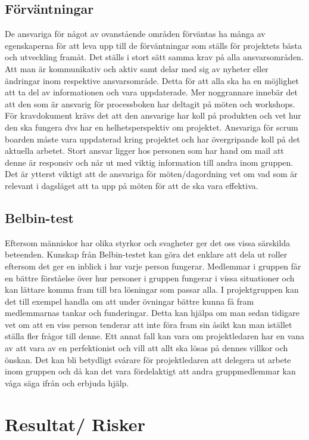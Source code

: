 \documentclass{article}
\begin{document}
\subsection{Förväntningar}

De ansvariga för något av ovanstående områden förväntas ha många av egenskaperna för att
leva upp till de förväntningar som ställs för projektets bästa och utveckling framåt. Det ställs i
stort sätt samma krav på alla ansvarsområden. Att man är kommunikativ och aktiv samt delar
med sig av nyheter eller ändringar inom respektive ansvarsområde. Detta för att alla ska ha en
möjlighet att ta del av informationen och vara uppdaterade. Mer noggrannare innebär det att
den som är ansvarig för processboken har deltagit på möten och workshops. För
kravdokument krävs det att den ansvarige har koll på produkten och vet hur den ska fungera
dvs har en helhetsperspektiv om projektet. Ansvariga för scrum boarden måste vara
uppdaterad kring projektet och har övergripande koll på det aktuella arbetet. Stort ansvar
ligger hos personen som har hand om mail att denne är responsiv och når ut med viktig
information till andra inom gruppen. Det är ytterst viktigt att de ansvariga för
möten/dagordning vet om vad som är relevant i dagsläget att ta upp på möten för att de ska
vara effektiva.

\subsection{Belbin-test}

Eftersom människor har olika styrkor och svagheter ger det oss vissa särskilda beteenden.
Kunskap från Belbin-testet kan göra det enklare att dela ut roller eftersom det ger en inblick i
hur varje person fungerar. Medlemmar i gruppen får en bättre förståelse över hur personer i
gruppen fungerar i vissa situationer och kan lättare komma fram till bra lösningar som passar
alla. I projektgruppen kan det till exempel handla om att under övningar bättre kunna få fram
medlemmarnas tankar och funderingar. Detta kan hjälpa om man sedan tidigare vet om att en
viss person tenderar att inte föra fram sin åsikt kan man istället ställa fler frågor till denne. Ett
annat fall kan vara om projektledaren har en vana av att vara av en perfektionist och vill att
allt ska lösas på dennes villkor och önskan. Det kan bli betydligt svårare för projektledaren att
delegera ut arbete inom gruppen och då kan det vara fördelaktigt att andra gruppmedlemmar
kan våga säga ifrån och erbjuda hjälp.
\section{Resultat/ Risker}
\end{document}
